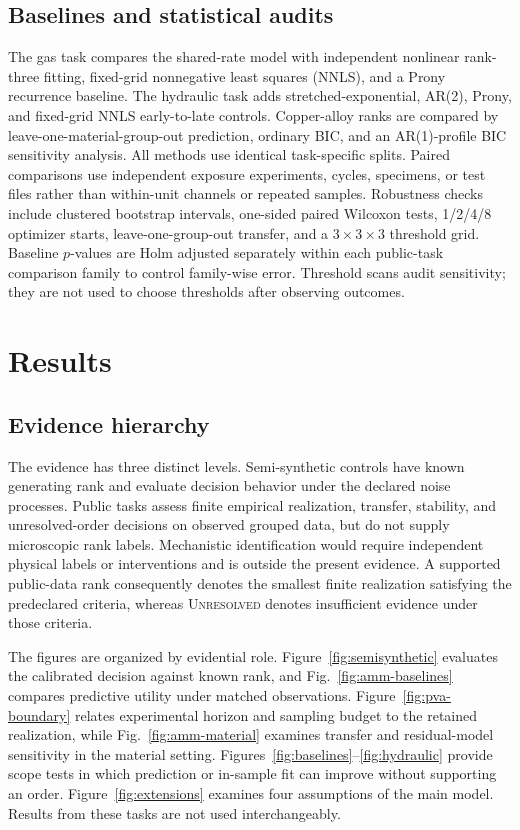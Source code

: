 \documentclass[11pt]{article}
\newcommand{\indet}{\textsc{Unresolved}}
\begin{document}
\subsection{Baselines and statistical audits}
The gas task compares the shared-rate model with independent nonlinear rank-three fitting, fixed-grid nonnegative least squares (NNLS), and a Prony recurrence baseline. The hydraulic task adds stretched-exponential, AR(2), Prony, and fixed-grid NNLS early-to-late controls. Copper-alloy ranks are compared by leave-one-material-group-out prediction, ordinary BIC, and an AR(1)-profile BIC sensitivity analysis. All methods use identical task-specific splits. Paired comparisons use independent exposure experiments, cycles, specimens, or test files rather than within-unit channels or repeated samples. Robustness checks include clustered bootstrap intervals, one-sided paired Wilcoxon tests, 1/2/4/8 optimizer starts, leave-one-group-out transfer, and a $3\times3\times3$ threshold grid. Baseline $p$-values are Holm adjusted separately within each public-task comparison family to control family-wise error. Threshold scans audit sensitivity; they are not used to choose thresholds after observing outcomes.

\section{Results}
\subsection{Evidence hierarchy}
The evidence has three distinct levels. Semi-synthetic controls have known generating rank and evaluate decision behavior under the declared noise processes. Public tasks assess finite empirical realization, transfer, stability, and unresolved-order decisions on observed grouped data, but do not supply microscopic rank labels. Mechanistic identification would require independent physical labels or interventions and is outside the present evidence. A supported public-data rank consequently denotes the smallest finite realization satisfying the predeclared criteria, whereas \indet{} denotes insufficient evidence under those criteria.

The figures are organized by evidential role. Figure~\ref{fig:semisynthetic} evaluates the calibrated decision against known rank, and Fig.~\ref{fig:amm-baselines} compares predictive utility under matched observations. Figure~\ref{fig:pva-boundary} relates experimental horizon and sampling budget to the retained realization, while Fig.~\ref{fig:amm-material} examines transfer and residual-model sensitivity in the material setting. Figures~\ref{fig:baselines}--\ref{fig:hydraulic} provide scope tests in which prediction or in-sample fit can improve without supporting an order. Figure~\ref{fig:extensions} examines four assumptions of the main model. Results from these tasks are not used interchangeably.
\end{document}
